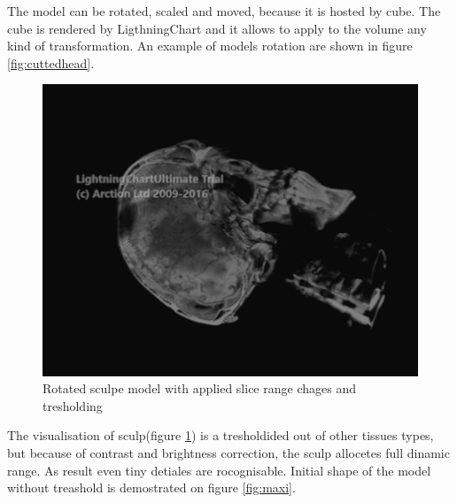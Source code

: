\documentclass[twoside, english, 11pt]{report}
\begin{document}
The model can be rotated, scaled and moved, because it is hosted by cube. The cube is rendered by LigthningChart and it allows to apply to the volume any kind of transformation. An example of models rotation are shown in figure \ref{fig:cuttedhead}.

\begin{figure}[H]
\centerline{\includegraphics[scale = 0.5]{img/sculp}}
\caption{Rotated sculpe model with applied slice range chages and tresholding\label{fig:sculp}}
\end{figure}

The visualisation of sculp(figure \ref{fig:sculp}) is a tresholdided out of other tissues types, but because of contrast and brightness correction, the sculp allocetes full dinamic range. As result even tiny detiales are rocognisable. Initial shape of the model without treashold is demostrated on figure \ref{fig:maxi}. 
\end{document}
